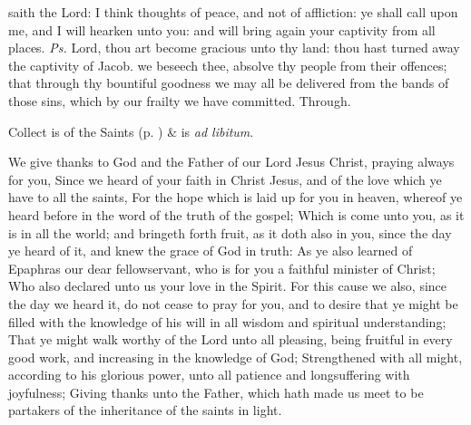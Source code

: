 


\properantiphonfix

\introit
{} saith the Lord: I think thoughts of peace, and not of affliction: ye shall call upon me, and I will hearken unto you: and will bring again your captivity from all places. \textit{Ps.} Lord, thou art become gracious unto thy land: thou hast turned away the captivity of Jacob.
\collect
{} we beseech thee, absolve thy people from their offences; that through thy bountiful goodness we may all be delivered from the bands of those sins, which by our frailty we have committed. Through.
\begin{rubric}
     Collect is of the Saints (p. \pageref{SPSaints}) \&  is \emph{ad libitum}.
\end{rubric}

 We give thanks to God and the Father of our Lord Jesus Christ, praying always for you, Since we heard of your faith in Christ Jesus, and of the love which ye have to all the saints, For the hope which is laid up for you in heaven, whereof ye heard before in the word of the truth of the gospel; Which is come unto you, as it is in all the world; and bringeth forth fruit, as it doth also in you, since the day ye heard of it, and knew the grace of God in truth: As ye also learned of Epaphras our dear fellowservant, who is for you a faithful minister of Christ; Who also declared unto us your love in the Spirit. For this cause we also, since the day we heard it, do not cease to pray for you, and to desire that ye might be filled with the knowledge of his will in all wisdom and spiritual understanding; That ye might walk worthy of the Lord unto all pleasing, being fruitful in every good work, and increasing in the knowledge of God; Strengthened with all might, according to his glorious power, unto all patience and longsuffering with joyfulness; Giving thanks unto the Father, which hath made us meet to be partakers of the inheritance of the saints in light.


